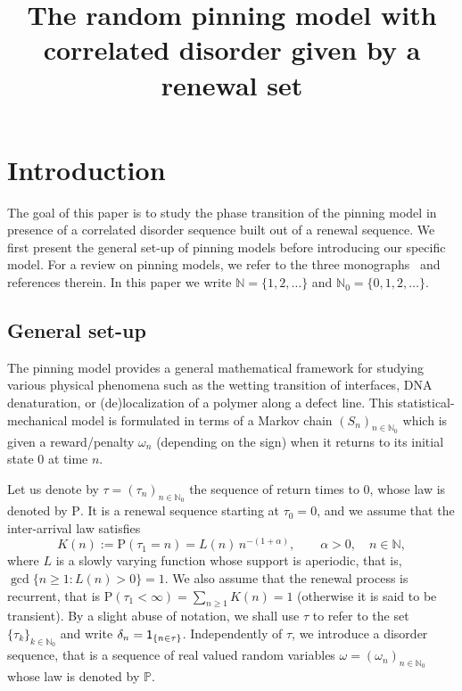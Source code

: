 \documentclass[AHL,Unicode,longabstracts]{cedram}
\title[Pinning on a renewal set]{The random pinning model with correlated disorder given by a renewal set}
\author[\initial{D.} \lastname{Cheliotis}]{\firstname{Dimitris} \lastname{Cheliotis}}
\author[\initial{Y.} \lastname{Chino}]{\firstname{Yuki} \lastname{Chino}}
\author[\initial{J.} \lastname{Poisat}]{\firstname{Julien} \lastname{Poisat}}
\newcommand{\bbN}{{\ensuremath{\mathbb N}}}
\newcommand{\bbP}{{\ensuremath{\mathbb P}}}
\newcommand{\ga}{\alpha}
\newcommand{\gd}{\delta}
\newcommand{\go}{\omega}
\newcommand\bP{\ensuremath{\mathrm{P}}}
\newcommand{\ind}{{\sf 1}}
\begin{document}
\maketitle


\section{Introduction}

The goal of this paper is to study the phase transition of the pinning model in presence of a correlated disorder sequence built out of a renewal sequence. We first present the general set-up of pinning models before introducing our specific model. For a review on pinning models, we refer to the three monographs~\cite{Gi2007, Gi2011, dH09} and references therein. In this paper we write $\bbN = \{1, 2, \ldots\}$ and $\bbN_0 = \{0, 1, 2,\ldots\}$.

\subsection{General set-up}

The pinning model provides a general mathematical framework for studying various physical phenomena such as the wetting transition of interfaces, DNA denaturation, or (de)localization of a polymer along a defect line. This statistical-mechanical model is formulated in terms of a Markov chain $(S_n)_{n\in\bbN_0}$ which is given a reward/penalty $\omega_n$ (depending on the sign) when it returns to its initial state $0$ at time $n$.

Let us denote by $\tau = (\tau_n)_{n\in\bbN_0}$ the sequence of return times to $0$, whose law is denoted by $\bP$. It is a renewal sequence starting at $\tau_0 = 0$, and we assume that the inter-arrival law satisfies
\begin{equation}\label{eq:defK_regvar}
K(n) := \bP(\tau_1 = n) = L(n) \, n^{- (1 + \ga)},\qquad \ga > 0,\quad n\in\bbN,
\end{equation}
where $L$ is a slowly varying function whose support is aperiodic, that is, $\gcd\{n \geq 1 \colon L(n) > 0\}= 1$. We also assume that the renewal process is recurrent, that is $\bP(\tau_1 < \infty) = \sum_{n\ge 1} K(n) = 1$ (otherwise it is said to be transient). By a slight abuse of notation, we shall use $\tau$ to refer to the set $\{\tau_k\}_{k\in\bbN_0}$ and write $\gd_n = \ind_{\{n\in\tau\}}$. Independently of $\tau$, we introduce a disorder sequence, that is a sequence of real valued random variables $\go = (\go_n)_{n\in \bbN_0}$ whose law is denoted by $\bbP$.
\end{document}
